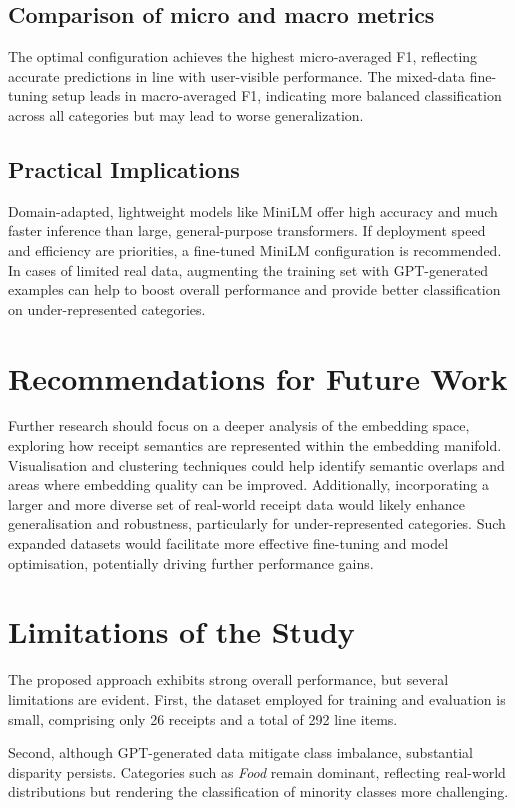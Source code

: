 \documentclass{SGGW-thesis-EN}
\begin{document}
\subsection{Comparison of micro and macro metrics}
The optimal configuration achieves the highest micro-averaged F1, reflecting accurate predictions in line
with user-visible performance. The mixed-data fine-tuning setup leads in macro-averaged F1, indicating
more balanced classification across all categories but may lead to worse generalization.

\subsection{Practical Implications}
Domain-adapted, lightweight models like MiniLM offer high accuracy and much faster inference than large, general-purpose
transformers. If deployment speed and efficiency are priorities, a fine-tuned MiniLM configuration is recommended. In cases
of limited real data, augmenting the training set with GPT-generated examples can help to boost overall performance and provide better classification on under-represented categories.

\section{Recommendations for Future Work}
Further research should focus on a deeper analysis of the embedding space, exploring how receipt semantics are
represented within the embedding manifold. Visualisation and clustering techniques could help identify semantic
overlaps and areas where embedding quality can be improved. Additionally, incorporating a larger and more diverse set
of real-world receipt data would likely enhance generalisation and robustness, particularly for under-represented
categories. Such expanded datasets would facilitate more effective fine-tuning and model optimisation, potentially
driving further performance gains.


\section{Limitations of the Study}
The proposed approach exhibits strong overall performance, but several limitations are evident. First, the dataset
employed for training and evaluation is small, comprising only 26 receipts and a total of 292 line items.

Second, although GPT-generated data mitigate class imbalance, substantial disparity persists. Categories such as
\emph{Food} remain dominant, reflecting real-world distributions but rendering the classification of minority classes
more challenging.
\end{document}
